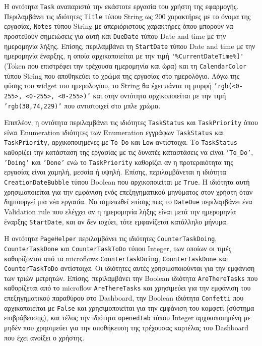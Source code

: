                 Η οντότητα \texttt{Task} αναπαριστά την εκάστοτε εργασία του χρήστη της εφαρμογής. Περιλαμβάνει τις ιδιότητες \texttt{Title} τύπου String ως 200 χαρακτήρες με το όνομα της εργασίας, \texttt{Notes} τύπου String με απεριόριστους χαρακτήρες όπου μπορούν να προστεθούν σημειώσεις για αυτή και \texttt{DueDate} τύπου Date and time με την ημερομηνία λήξης. Επίσης, περιλαμβάνει τη \texttt{StartDate} τύπου Date and time με την ημερομηνία έναρξης, η οποία αρχικοποιείται με την τιμή \verb|'%CurrentDateTime%]'| (Token που επιστρέφει την τρέχουσα ημερομηνία και ώρα) και τη \texttt{CalendarColor} τύπου String που αποθηκεύει το χρώμα της εργασίας στο ημερολόγιο. Λόγω της φύσης του widget του ημερολογίου, το String θα έχει πάντα τη μορφή \texttt{'rgb(<0-255>, <0-255>, <0-255>)'} και στην οντότητα αρχικοποιείται με την τιμή \texttt{'rgb(38,74,229)'} που αντιστοιχεί στο μπλε χρώμα.

                Επιπλέον, η οντότητα περιλαμβάνει τις ιδιότητες \texttt{TaskStatus} και \texttt{TaskPriority} όπου είναι Enumeration ιδιότητες των Enumeration εγγράφων \texttt{TaskStatus} και \linebreak \texttt{TaskPriority}, αρχικοποιημένες με \texttt{To\_Do} και \texttt{Low} αντίστοιχα. Το \texttt{TaskStatus} καθορίζει την κατάσταση της εργασίας με τις δυνατές καταστάσεις να είναι \texttt{'To\_Do'}, \texttt{'Doing'} και \texttt{'Done'} ενώ το \texttt{TaskPriority} καθορίζει αν η προτεραιότητα της εργασίας είναι χαμηλή, μεσαία ή υψηλή. Επίσης, περιλαμβάνεται η ιδιότητα \texttt{CreationDateBubble} τύπου Boolean που αρχικοποιείται με \texttt{True}. Η ιδιότητα αυτή χρησιμοποιείται για την εμφάνιση ενός επεξηγηματικού μηνύματος στον χρήστη όταν δημιουργεί μια νέα εργασία. Να σημειωθεί επίσης πως το \texttt{DateDue} περιλαμβάνει ένα Validation rule που ελέγχει αν η ημερομηνία λήξης είναι μετά την ημερομηνία έναρξης \texttt{StartDate}, και αν δεν ισχύει, τότε εμφανίζεται κατάλληλο μήνυμα.

                Η οντότητα \texttt{PageHelper} περιλαμβάνει τις ιδιότητες \texttt{CounterTaskDoing}, \linebreak \texttt{CounterTaskDone} και \texttt{CounterTaskToDo} τύπου Integer, των οποίων οι τιμές καθορίζονται από τα microflows \texttt{CounterTaskDoing}, \texttt{CounterTaskDone} και \texttt{CounterTaskToDo} αντίστοιχα. Οι ιδιότητες αυτές χρησιμοποιούνται για την εμφάνιση των τριών μετρητών. Επίσης, περιλαμβάνει την Boolean ιδιότητα \texttt{AreThereTasks} που καθορίζεται από το microflow \texttt{AreThereTasks} και χρησιμεύει για την εμφάνιση του επεξηγηματικού παραθύρου στο Dashboard, την Boolean ιδιότητα \texttt{Confetti} που αρχικοποιείται με \texttt{False} και χρησιμοποιείται για την εμφάνιση του κομφετί (σύστημα επιβράβευσης), και τέλος την ιδιότητα \texttt{openedTab} τύπου Integer αρχικοποιημένη με μηδέν που χρησιμεύει για την αποθήκευση της τρέχουσας καρτέλας του Dashboard που έχει ανοίξει ο χρήστης.

